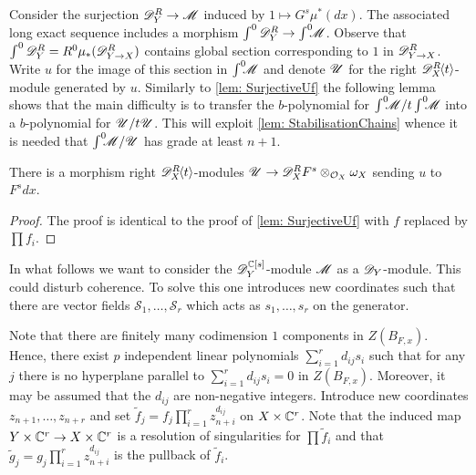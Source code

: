 Consider the surjection $\mathscr{D}_Y^R\to \mathscr{M}$ induced by $1\mapsto G^s \mu^*(dx)$.
The associated long exact sequence includes a morphism $\int^0 \mathscr{D}_Y^R \to \int^0 \mkern -8mu\mathscr{M}$.
Observe that $\int^0 \mathscr{D}_Y^R = R^0\mu_*(\mathscr{D}_{Y\to X}^R)$ contains global section corresponding to $1$ in $\mathscr{D}_{Y\to X}^R$.
Write $u$ for the image of this section in $\int^0 \mkern -8mu \mathscr{M}$ and denote $\mathscr{U}$ for the right $\mathscr{D}_X^R\mkern-5mu\left\langle t \right\rangle$-module generated by $u$.
Similarly to \cref{lem: SurjectiveUf} the following lemma shows that the main difficulty is to transfer the $b$-polynomial for $\int^0 \mkern -8mu\mathscr{M}/t\int^0 \mkern -8mu\mathscr{M}$ into a $b$-polynomial for $\mathscr{U}/t\mathscr{U}$.
This will exploit \cref{lem: StabilisationChains} whence it is needed that $\int^0 \mkern -8mu\mathscr{M} /\mathscr{U}$ has grade at least $n+1$.\\
\begin{lemma}\label{lem: SurjectionUF}
  There is a morphism right $\mathscr{D}_X^R\mkern-5mu\left\langle t \right\rangle$-modules $\mathscr{U}\to \mathscr{D}_X^RF^s \otimes_{\mathcal{O}_X}\omega_X$ sending $u$ to $F^sdx$.
\end{lemma}
\begin{proof}
   The proof is identical to the proof of \cref{lem: SurjectiveUf} with $f$ replaced by $\prod f_i$.
\end{proof}

In what follows we want to consider the $\mathscr{D}_Y^{\mathbb{C}[s]}$-module $\mathscr{M}$ as a $\mathscr{D}_Y$-module.
This could disturb coherence.
To solve this one introduces new coordinates such that there are vector fields $\mathcal{S}_1,\ldots, \mathcal{S}_r$ which acts as $s_1,\ldots,s_r$ on the generator.

Note that there are finitely many codimension $1$ components in $Z(B_{F,x})$.
Hence, there exist $p$ independent linear polynomials $\sum_{i=1}^r d_{ij}s_i$ such that for any $j$ there is no hyperplane parallel to $\sum_{i=1}^r d_{ij}s_i = 0$ in $Z(B_{F,x})$.
Moreover, it may be assumed that the $d_{ij}$ are non-negative integers.
Introduce new coordinates $z_{n+1}, \ldots,z_{n+r}$ and set $\widetilde{f}_j = f_j\prod_{i=1}^r z_{n+i}^{d_{ij}}$ on $X\times \mathbb{C}^r$.
Note that the induced map $Y\times \mathbb{C}^r \to X\times \mathbb{C}^r$ is a resolution of singularities for $\prod \widetilde{f}_i$ and that $\widetilde{g}_j = g_j\prod_{i=1}^r z_{n+i}^{d_{ij}}$ is the pullback of $\widetilde{f}_i$.


